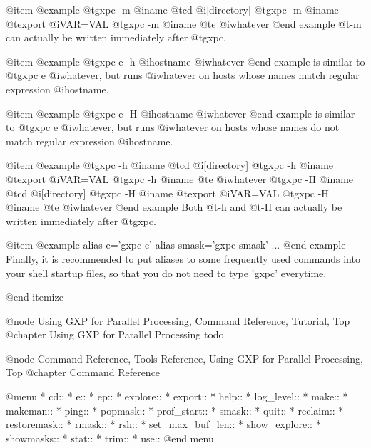 @item 
@example
@t{gxpc -m} @i{name} @t{cd} @i{[directory]}
@t{gxpc -m} @i{name} @t{export} @i{VAR=VAL}
@t{gxpc -m} @i{name} @t{e} @i{whatever}
@end example
@t{-m} can actually be written immediately after @t{gxpc}.

@item 
@example
@t{gxpc e} -h @i{hostname} @i{whatever}
@end example
is similar to @t{gxpc e} @i{whatever}, but runs @i{whatever} on
hosts whose names match regular expression @i{hostname}. 

@item 
@example
@t{gxpc e} -H @i{hostname} @i{whatever}
@end example
is similar to @t{gxpc e} @i{whatever}, but runs @i{whatever} on
hosts whose names do not match regular expression @i{hostname}. 

@item 
@example
@t{gxpc -h} @i{name} @t{cd} @i{[directory]}
@t{gxpc -h} @i{name} @t{export} @i{VAR=VAL}
@t{gxpc -h} @i{name} @t{e} @i{whatever}
@t{gxpc -H} @i{name} @t{cd} @i{[directory]}
@t{gxpc -H} @i{name} @t{export} @i{VAR=VAL}
@t{gxpc -H} @i{name} @t{e} @i{whatever}
@end example
Both @t{-h} and @t{-H} can actually be written immediately after @t{gxpc}.

@item
@example
alias e='gxpc e'
alias smask='gxpc smask'
...
@end example
Finally, it is recommended to put aliases to some frequently used
commands into your shell startup files, so that you do not need to
type 'gxpc' everytime.


@end itemize




@node Using GXP for Parallel Processing, Command Reference, Tutorial, Top
@chapter Using GXP for Parallel Processing
todo

@node Command Reference, Tools Reference, Using GXP for Parallel Processing, Top
@chapter Command Reference

@menu
* cd::                          
* e::                           
* ep::                          
* explore::                     
* export::                      
* help::                        
* log_level::                   
* make::                        
* makeman::                     
* ping::                        
* popmask::                     
* prof_start::                  
* smask::                       
* quit::                        
* reclaim::                     
* restoremask::                 
* rmask::                       
* rsh::                         
* set_max_buf_len::             
* show_explore::                
* showmasks::                   
* stat::                        
* trim::                        
* use::                         
@end menu

